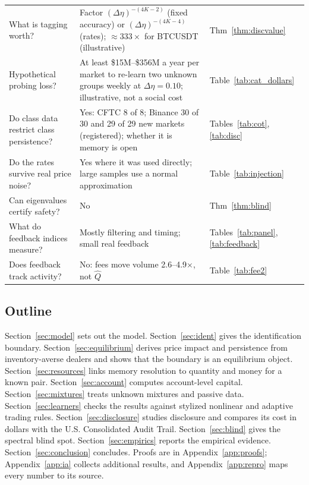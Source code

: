 \documentclass[12pt]{article}
\theoremstyle{definition}
\theoremstyle{remark}
\begin{document}
\begin{table}[t]
\begin{threeparttable}
\begin{tabular}{p{}p{}p{}}
What is tagging worth? & Factor $(\Delta\eta)^{-(4K-2)}$ (fixed accuracy) or $(\Delta\eta)^{-(4K-4)}$ (rates); $\approx333\times$ for BTCUSDT (illustrative) & Thm~\ref{thm:discvalue}\\
Hypothetical probing loss? & At least \$15M--\$356M a year per market to re-learn two unknown groups weekly at $\Delta\eta=0.10$; illustrative, not a social cost & Table~\ref{tab:cat_dollars}\\
Do class data restrict class persistence? & Yes: CFTC 8 of 8; Binance 30 of 30 and 29 of 29 new markets (registered); whether it is memory is open & Tables~\ref{tab:cot}, \ref{tab:disc}\\
Do the rates survive real price noise? & Yes where it was used directly; large samples use a normal approximation & Table~\ref{tab:injection}\\
Can eigenvalues certify safety? & No & Thm~\ref{thm:blind}\\
What do feedback indices measure? & Mostly filtering and timing; small real feedback & Tables~\ref{tab:panel}, \ref{tab:feedback}\\
Does feedback track activity? & No: fees move volume 2.6--4.9$\times$, not $\hat Q$ & Table~\ref{tab:fee2}\\
\bottomrule
\end{tabular}
\end{threeparttable}
\end{table}

\subsection{Outline}
Section~\ref{sec:model} sets out the model. Section~\ref{sec:ident} gives the identification boundary. Section~\ref{sec:equilibrium} derives price impact and persistence from inventory-averse dealers and shows that the boundary is an equilibrium object. Section~\ref{sec:resources} links memory resolution to quantity and money for a known pair. Section~\ref{sec:account} computes account-level capital. Section~\ref{sec:mixtures} treats unknown mixtures and passive data. Section~\ref{sec:learners} checks the results against stylized nonlinear and adaptive trading rules. Section~\ref{sec:disclosure} studies disclosure and compares its cost in dollars with the U.S. Consolidated Audit Trail. Section~\ref{sec:blind} gives the spectral blind spot. Section~\ref{sec:empirics} reports the empirical evidence. Section~\ref{sec:conclusion} concludes. Proofs are in Appendix~\ref{app:proofs}; Appendix~\ref{app:ia} collects additional results, and Appendix~\ref{app:repro} maps every number to its source.
\end{document}

